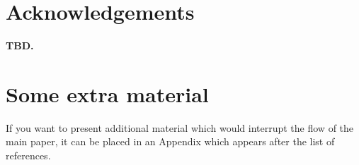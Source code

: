 \documentclass[fleqn,usenatbib]{mnras}
\begin{document}
\section*{Acknowledgements}

\textbf{TBD.}











\appendix

\section{Some extra material}

If you want to present additional material which would interrupt the flow of the main paper,
it can be placed in an Appendix which appears after the list of references.



\bsp	%
\label{lastpage}
\end{document}
